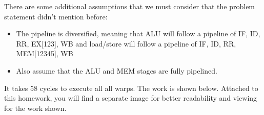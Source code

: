 \documentclass[11pt]{article}
\begin{document}
\begin{Answer}
There are some additional assumptions that we must consider that the problem statement didn't mention before:
\begin{itemize}
    \item The pipeline is diversified, meaning that ALU will follow a pipeline of IF, ID, RR, EX[123], WB and load/store will follow a pipeline of IF, ID, RR, MEM[12345], WB
    \item Also assume that the ALU and MEM stages are fully pipelined. 
\end{itemize}

It takes 58 cycles to execute all all warps. The work is shown below. Attached to this homework, you will find a separate image for better readability and viewing for the work shown.


\end{Answer}
\end{document}
